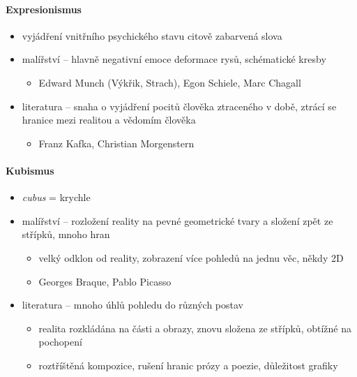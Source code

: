 \paragraph{Expresionismus}
\begin{itemize}
\item vyjádření vnitřního psychického stavu \ra  citově zabarvená slova
\item malířství -- hlavně negativní emoce \ra deformace rysů, schématické kresby
	\begin{itemize}
	\item Edward Munch (Výkřik, Strach), Egon Schiele, Marc Chagall	
	\end{itemize}
\item literatura -- snaha o vyjádření pocitů člověka ztraceného v době, ztrácí se hranice mezi realitou a vědomím člověka
	\begin{itemize}
	\item Franz Kafka, Christian Morgenstern
	\end{itemize}
\end{itemize}

\paragraph{Kubismus}
\begin{itemize}
\item \textit{cubus} = krychle
\item malířství -- rozložení reality na pevné geometrické tvary a složení zpět ze střípků, mnoho hran
	\begin{itemize}
	\item velký odklon od reality, zobrazení více pohledů na jednu věc, někdy 2D
	\item Georges Braque, Pablo Picasso
	\end{itemize}
\item literatura -- mnoho úhlů pohledu do různých postav
	\begin{itemize}
	\item realita rozkládána na části a obrazy, znovu složena ze střípků, obtížné na pochopení
	\item roztříštěná kompozice, rušení hranic prózy a poezie, důležitost grafiky
	\end{itemize}
\end{itemize}


